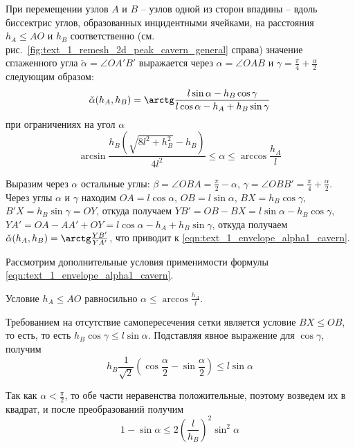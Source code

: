 \begin{lemma}\label{lem:text_1_cavern_smooth}
При перемещении узлов $A$ и $B$ -- узлов одной из сторон впадины -- вдоль биссектрис углов, образованных инцидентными ячейками, на расстояния $h_A \le AO$ и $h_B$ соответственно (см. рис.~\ref{fig:text_1_remesh_2d_peak_cavern_general} справа) значение сглаженного угла $\check{\alpha} = \angle OA'B'$ выражается через $\alpha = \angle OAB$ и $\gamma = \frac{\pi}{4} + \frac{\alpha}{2}$ следующим образом:
\begin{equation}\label{eqn:text_1_envelope_alpha1_cavern}
\check{\alpha}(h_A, h_B) = \arctg \frac{l \sin \alpha - h_B \cos \gamma}{l \cos \alpha - h_A + h_B \sin \gamma}
\end{equation}
при ограничениях на угол $\alpha$
\begin{equation}\label{eqn:text_1_envelope_alpha1_cavern2}
\arcsin \frac{h_B \left( \sqrt{8 l^2 + h_B^2} - h_B \right)}{4 l^2} \le \alpha \le \arccos \frac{h_A}{l}
\end{equation}
\end{lemma}

Выразим через $\alpha$ остальные углы: $\beta = \angle OBA = \frac{\pi}{2} - \alpha$, $\gamma = \angle OBB' = \frac{\pi}{4} + \frac{\alpha}{2}$.
Через углы $\alpha$ и $\gamma$ находим $OA = l \cos \alpha$, $OB = l \sin \alpha$, $BX = h_B \cos \gamma$, $B'X = h_B \sin \gamma = OY$, откуда получаем $YB' = OB - BX = l \sin \alpha - h_B \cos \gamma$, $YA' = OA - AA' + OY = l \cos \alpha - h_A + h_B \sin \gamma$, откуда получаем $\check{\alpha}(h_A, h_B) = \arctg \frac{YB'}{YA'}$, что приводит к \eqref{eqn:text_1_envelope_alpha1_cavern}.

Рассмотрим дополнительные условия применимости формулы \eqref{eqn:text_1_envelope_alpha1_cavern}.

Условие $h_A \le AO$ равносильно $\alpha \le \arccos \frac{h_A}{l}$.

Требованием на отсутствие самопересечения сетки является условие $BX \le OB$, то есть, то есть $h_B \cos \gamma \le l \sin \alpha$.
Подставляя явное выражение для $\cos \gamma$, получим
\begin{equation}
	h_B \frac{1}{\sqrt{2}} \left( \cos \frac{\alpha}{2} - \sin \frac{\alpha}{2} \right) \le l \sin \alpha
\end{equation}

Так как $\alpha < \frac{\pi}{2}$, то обе части неравенства положительные, поэтому возведем их в квадрат, и после преобразований получим
\begin{equation}\label{eqn:text_1_envelope_find_alpha3}
	1 - \sin \alpha \le 2 \left( \frac{l}{h_B} \right)^2 \sin^2 \alpha
\end{equation}

